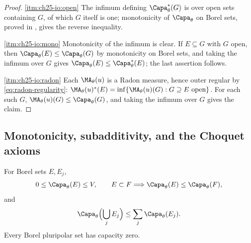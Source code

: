 \begin{proof}
\cref{itm:ch25-io:open}  The infimum defining \(\Capa_\theta^*(G)\) is over
open sets containing \(G\), of which \(G\) itself is one; monotonicity of
\(\Capa_\theta\) on Borel sets, proved in
, gives the reverse inequality.

\cref{itm:ch25-io:mono}  Monotonicity of the infimum is clear.  If
\(E\subseteq G\) with \(G\) open, then
\(\Capa_\theta(E)\leq\Capa_\theta(G)\) by monotonicity on Borel sets, and
taking the infimum over \(G\) gives
\(\Capa_\theta(E)\leq\Capa_\theta^*(E)\); the last assertion follows.

\cref{itm:ch25-io:radon}  Each \(\MA_\theta(u)\) is a Radon measure, hence
outer regular by \eqref{eq:radon-regularity}: \(\MA_\theta(u)^*(E)
=\inf\{\MA_\theta(u)(G):G\supseteq E\ \text{open}\}\).  For each such \(G\),
\(\MA_\theta(u)(G)\leq\Capa_\theta(G)\), and taking the infimum over \(G\)
gives the claim.
\end{proof}

\subsection{Monotonicity, subadditivity, and the Choquet axioms}
\label{sec:ch25-elementary}

\begin{proposition}
\label{prop:capacity-elementary}
For Borel sets \(E,E_j\),
\[
 0\leq\Capa_\theta(E)\leq V,\qquad
 E\subset F\Longrightarrow\Capa_\theta(E)\leq\Capa_\theta(F),
\]
and
\begin{equation}
\label{eq:capacity-subadditivity}
                  \Capa_\theta\Bigl(\bigcup_jE_j\Bigr)
                  \leq\sum_j\Capa_\theta(E_j).
\end{equation}
Every Borel pluripolar set has capacity zero.
\end{proposition}

